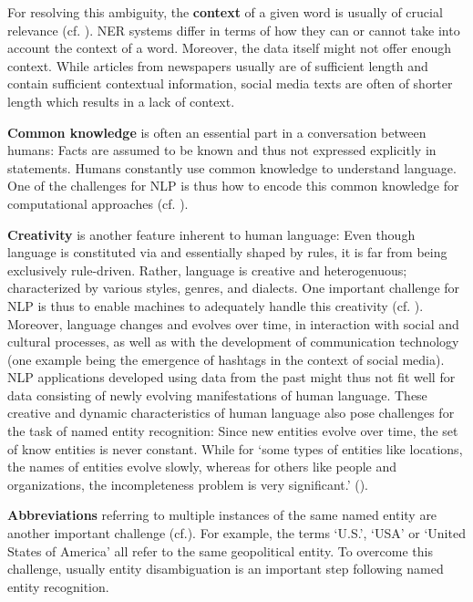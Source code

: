 For resolving this ambiguity, the \textbf{context} of a given word is usually of crucial relevance (cf. \cite[387]{aggarwal_machine_2018}).  NER systems differ in terms of how they can or cannot take into account the context of a word. Moreover, the data itself might not offer enough context. While articles from newspapers usually are of sufficient length and contain sufficient contextual information, social media texts are often of shorter length which results in a lack of context. 

\textbf{Common knowledge} is often an essential part in a conversation between humans: Facts are assumed to be known and thus not expressed explicitly in statements. Humans constantly use common knowledge to understand language. One of the challenges for NLP is thus how to encode this common knowledge for computational approaches (cf. \cite[13-14]{vajjala_practical_2020}). 

\textbf{Creativity} is another feature inherent to human language: Even though language is constituted via and essentially shaped by rules, it is far from being exclusively rule-driven. Rather, language is creative and heterogenuous; characterized by various styles, genres, and dialects. One important challenge for NLP is thus to enable machines to adequately handle this creativity (cf. \cite[14]{vajjala_practical_2020}). Moreover, language changes and evolves over time, in interaction with social and cultural processes, as well as with the development of communication technology (one example being the emergence of hashtags in the context of social media). NLP applications developed using data from the past might thus not fit well for data consisting of newly evolving manifestations of human language. These creative and dynamic characteristics of human language also pose challenges for the task of named entity recognition: Since new entities evolve over time, the set of know entities is never constant. While for `some types of entities like locations, the names of entities evolve slowly, whereas for others like people and organizations, the incompleteness problem is very significant.' (\cite[386]{aggarwal_machine_2018}). 

\textbf{Abbreviations} referring to multiple instances of the same named entity are another important challenge (cf.\cite[387]{aggarwal_machine_2018}). For example, the terms `U.S.', `USA' or `United States of America' all refer to the same geopolitical entity. To overcome this challenge, usually entity disambiguation is an important step following named entity recognition.

